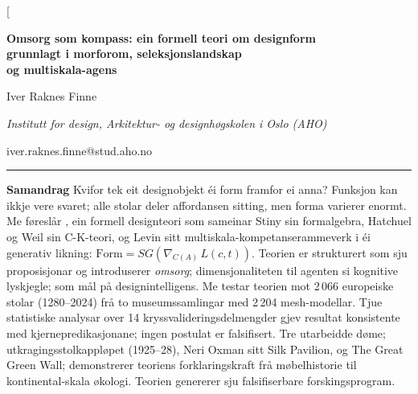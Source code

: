 

\usepackage[nynorsk]{babel}
\renewcommand{\figurename}{Figur}
\renewcommand{\tablename}{Tabell}



\twocolumn[{%
\begin{@twocolumnfalse}

\vspace*{2mm}

{\centering
{\Large\bfseries Omsorg som kompass: ein formell teori om designform\\[2pt]
grunnlagt i morforom, seleksjonslandskap\\[2pt]
og multiskala-agens\par}

\vspace{8pt}

{\normalsize Iver Raknes Finne\par}
\vspace{1pt}
{\small\itshape Institutt for design, Arkitektur- og designhøgskolen i Oslo (AHO)\par}
\vspace{0pt}
{\small iver.raknes.finne@stud.aho.no\par}

\vspace{10pt}

\begin{minipage}{0.94\textwidth}
\noindent\rule{\textwidth}{0.4pt}
\vspace{4pt}

{\footnotesize
\noindent\textbf{Samandrag}\quad
Kvifor tek eit designobjekt éi form framfor ei anna? Funksjon kan ikkje vere svaret; alle stolar deler affordansen sitting, men forma varierer enormt. Me føreslår \formlaere{}, ein formell designteori som sameinar Stiny sin formalgebra, Hatchuel og Weil sin C-K-teori, og Levin sitt multiskala-kompetanserammeverk i éi generativ likning: $\mathrm{Form} = SG(\nabla_{C(A)}\, L(c,t))$. Teorien er strukturert som sju proposisjonar og introduserer \textit{omsorg}; dimensjonaliteten til agenten si kognitive lyskjegle; som mål på designintelligens. Me testar teorien mot 2\,066 europeiske stolar (1280--2024) frå to museumssamlingar med 2\,204 mesh-modellar. Tjue statistiske analysar over 14 kryssvalideringsdelmengder gjev resultat konsistente med kjernepredikasjonane; ingen postulat er falsifisert. Tre utarbeidde døme; utkragingsstolkappløpet (1925--28), Neri Oxman sitt Silk Pavilion, og The Great Green Wall; demonstrerer teoriens forklaringskraft frå møbelhistorie til kontinental-skala økologi. Teorien genererer sju falsifiserbare forskingsprogram.

}
\end{minipage}}
\end{@twocolumnfalse}}
